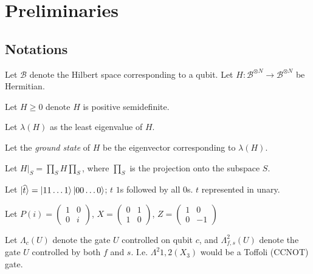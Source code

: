 \section{Preliminaries}

\subsection{Notations}

Let $\mathcal{B}$ denote the Hilbert space corresponding to a qubit.
Let $H:\mathcal{B}^{\otimes N}\rightarrow\mathcal{B}^{\otimes N}$ be Hermitian.

\begin{definition}
	Let $H\geq0$ denote $H$ is positive semidefinite.
\end{definition}

\begin{definition}
	Let $\lambda(H)$ as the least eigenvalue of $H$.
\end{definition}

\begin{definition}
	Let the \emph{ground state} of $H$ be the eigenvector corresponding to $\lambda(H)$.
\end{definition}

\begin{definition}
	Let $H\big|_S=\prod_SH\prod_S$, where $\prod_S$ is the projection onto the subspace $S$.
\end{definition}

\begin{definition}
	Let $\ket{\widehat{t}}=\ket{11\ldots1} \ket{00\ldots0}$; $t$ $1$s followed by all $0$s. $t$ represented in unary.
\end{definition}

\begin{definition}
	Let $P(i)=\begin{pmatrix}1&0\\0&i\end{pmatrix}$, $X=\begin{pmatrix}0&1\\1&0\end{pmatrix}$, $Z=\begin{pmatrix}1&0\\0&-1\end{pmatrix}$
\end{definition}

\begin{definition}
	Let $\Lambda_c(U)$ denote the gate $U$ controlled on qubit $c$, and $\Lambda^2_{f, s}(U)$ denote the gate $U$ controlled by both $f$ and $s$. I.e. $\Lambda^2{1, 2}(X_3)$ would be a Toffoli (CCNOT) gate.
\end{definition}

